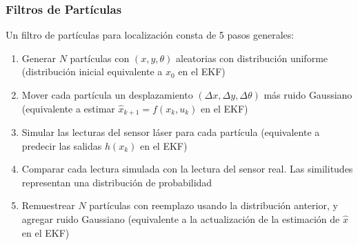 \begin{frame}\frametitle{Filtros de Partículas}
  Un filtro de partículas para localización consta de 5 pasos generales:
  \begin{enumerate}
  \item Generar $N$ partículas con $(x,y,\theta)$ aleatorias con distribución uniforme (distribución inicial equivalente a $\hat{x}_0$ en el EKF)
  \item Mover cada partícula un desplazamiento $(\Delta x, \Delta y, \Delta\theta)$ más ruido Gaussiano (equivalente a estimar $\hat{x}_{k+1} = f(x_k, u_k)$ en el EKF)
  \item Simular las lecturas del sensor láser para cada partícula (equivalente a predecir las salidas $h(x_k)$ en el EKF)
  \item Comparar cada lectura simulada con la lectura del sensor real. Las similitudes representan una distribución de probabilidad 
  \item Remuestrear $N$ partículas con reemplazo usando la distribución anterior, y agregar ruido Gaussiano (equivalente a la actualización de la estimación de $\hat{x}$ en el EKF)
  \end{enumerate}
\end{frame}

